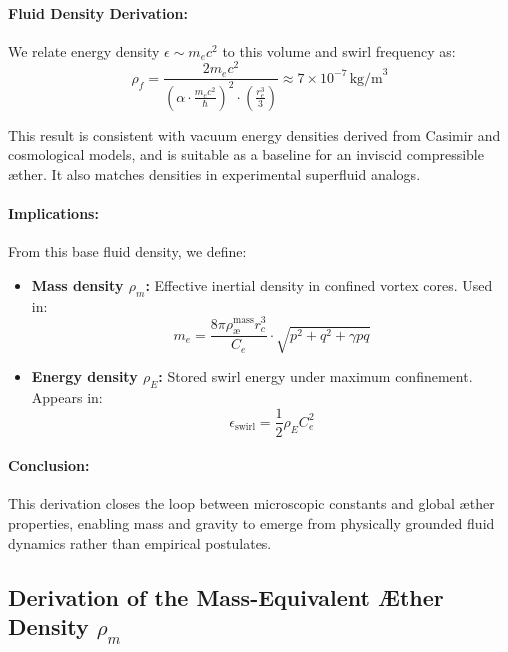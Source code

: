 \documentclass[preprint]{revtex4-2}
\begin{document}
                \paragraph{Fluid Density Derivation:}
                We relate energy density \( \epsilon \sim m_e c^2 \) to this volume and swirl frequency as:
                \[
                \rho_{\scriptscriptstyle\boldsymbol\!f} = \frac{2 m_e c^2}{\left( \alpha \cdot \frac{m_e c^2}{\hbar} \right)^2 \cdot \left( \frac{r_e^3}{3} \right)} \approx 7 \times 10^{-7} \, \text{kg/m}^3
                \]
        
                This result is consistent with vacuum energy densities derived from Casimir and cosmological models, and is suitable as a baseline for an inviscid compressible æther. It also matches densities in experimental superfluid analogs.
        
                \paragraph{Implications:}
                From this base fluid density, we define:
                \begin{itemize}
                    \item \textbf{Mass density \boldmath\( \rho_{\scriptscriptstyle\boldsymbol\!m} \):} Effective inertial density in confined vortex cores. Used in:
                    \[
                    m_e = \frac{8\pi \rho_{\text{\ae}}^{\text{mass}} r_c^3}{C_e} \cdot \sqrt{p^2 + q^2 + \gamma pq}
                    \]
                    \item \textbf{Energy density \boldmath\( \rho_{\scriptscriptstyle\boldsymbol\!E} \):} Stored swirl energy under maximum confinement. Appears in:
                    \[
                    \epsilon_{\text{swirl}} = \frac{1}{2} \rho_{\scriptscriptstyle\boldsymbol\!E} C_e^2
                    \]
                \end{itemize}
        
                \paragraph{Conclusion:}
                This derivation closes the loop between microscopic constants and global æther properties, enabling mass and gravity to emerge from physically grounded fluid dynamics rather than empirical postulates.
        
                \subsection{Derivation of the Mass-Equivalent Æther Density \boldmath\( \rho_{\scriptscriptstyle\boldsymbol\!m} \)}
        
\end{document}
